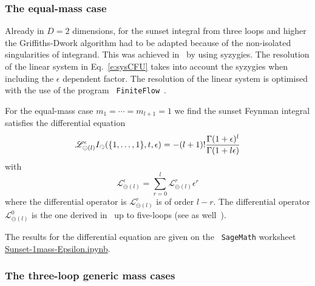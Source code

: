 \documentclass[a4paper,12pt]{article}
\numberwithin{equation}{section}
\numberwithin{figure}{section}
\def\su{\circleddash}
\begin{document}
   \subsubsection{The equal-mass case}\label{sec:highersunset1mass}
Already in $D=2$ dimensions, for the sunset integral from three loops
and higher  the Griffiths-Dwork algorithm had to be adapted because of
the non-isolated singularities of integrand. This was achieved
in~\cite{Lairez:2022zkj} by using syzygies. The resolution of the
linear system in Eq.~\eqref{e:sysCFU} takes into account the syzygies
when including the $\epsilon$ dependent factor.   The resolution of
the linear system is optimised with the use of the program {\tt
  FiniteFlow}~\cite{Peraro:2019svx}.


   
For the equal-mass case $m_1=\cdots =m_{l+1}=1$ we find the sunset
Feynman integral satisfies the differential equation
\begin{equation}
  \mathscr{L}_{\su(l)}^\epsilon I_\su(\{1,\dots,1\},t,\epsilon)=
  -(l+1)! {\Gamma(1+\epsilon)^l\over \Gamma(1+l\epsilon)}
\end{equation}
with
\begin{equation}
  \mathscr{L}_{\su(l)}^{\epsilon} =\sum_{r=0}^{l}  \mathscr{L}_{\su(l)}^{r} \epsilon^r
\end{equation}
where the differential operator is $ \mathscr{L}_{\su(l)}^{r}$ is of
order $l-r$. The differential operator $ \mathscr{L}_{\su(l)}^{0}$ is
the one derived in~\cite{Vanhove:2014wqa} up to five-loops (see as well~\cite{Bonisch:2020qmm,Pogel:2022yat,Pogel:2022ken,Pogel:2022vat}).

The results for the differential equation are given on the {\tt
  SageMath} worksheet \href{Sunset-1mass-Epsilon.ipynb}{Sunset-1mass-Epsilon.ipynb}.



\subsubsection{The three-loop generic mass cases}\label{sec:threeloop}
\end{document}
